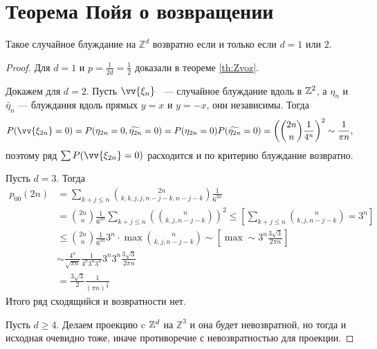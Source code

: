 \section{Теорема Пойя о возвращении}

\begin{theorem}
    Такое случайное блуждание на $\mathbb{Z}^d$ возвратно если и только если $d = 1$ или $2$.
\end{theorem}

\begin{proof}
    Для $d = 1$ и $p = \frac{1}{2d} = \frac{1}{2}$ доказали в теореме \ref{th:Zvoz}. 

   Докажем для $d = 2$. Пусть $\vv{\xi_n}$ ~--- случайное блуждание вдоль в $\mathbb{Z}^2$, а $\eta_n$ и $\widetilde{\eta_n}$ --- блуждания вдоль прямых $y=x$ и $y = -x$, они независимы. Тогда
$$P(\vv{\xi_{2n}} = 0)= P(\eta_{2n} = 0, \widetilde{\eta_{2n}} = 0) = P(\eta_{2n} = 0)P( \widetilde{\eta_{2n}} = 0)=
        \left(\binom{2n}{n}\frac{1}{4^n}\right)^2 \sim \frac{1}{\pi n},$$ поэтому ряд $\sum P(\vv{\xi_{2n}} = 0)$ расходится и по критерию блуждание возвратно.

 

       Пусть $d = 3$.
       Тогда
       \begin{align*}
           p_{00}(2n) &= \sum\limits_{k + j \le n} \binom{2n}{k,k,j,j, n - j - k, n-j-k} \frac{1}{6^{2n}} \\&=
        \binom{2n}{n}\frac{1}{6^{2n}}\sum\limits_{k + j\le n}\left(\binom{n}{k,j,n-j-k}\right)^2 \le \left[\sum\limits_{k + j\le n}\binom{n}{k,j,n-j-k} = 3^n\right] \\&\le \binom{2n}{n}\frac{1}{6^{2n}}3^n\cdot\max\binom{n}{k,j,n-j-k} \sim \left[\max \sim 3^n \frac{3\sqrt{3}}{2\pi n}\right] \\&\sim \frac{4^n}{\sqrt{\pi n}}\frac{1}{4^n3^n3^n}3^n3^n\frac{3\sqrt{3}}{2\pi n} \\&= \frac{3\sqrt{3}}{2}\frac{1}{(\pi n)^{\frac{3}{2}}}
       \end{align*}
   Итого ряд сходящийся и возвратности нет.
    
   
    Пусть $d \ge 4$. Делаем проекцию c $\mathbb{Z}^d$ на $\mathbb{Z}^3$ и она будет невозвратной, но тогда и исходная очевидно тоже, иначе противоречие с невозвратностью для проекции.
\end{proof}\newpage
